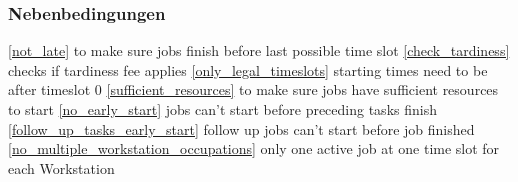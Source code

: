 \documentclass[a4paper,12pt,twoside]{scrreprt}
\begin{document}
\subsubsection*{Nebenbedingungen}
\begin{flushleft}
\autoref{not_late} to make sure jobs finish before last possible time slot\linebreak
\autoref{check_tardiness} checks if tardiness fee applies\linebreak
\autoref{only_legal_timeslots} starting times need to be after timeslot 0\linebreak
\autoref{sufficient_resources} to make sure jobs have sufficient resources to start\linebreak
\autoref{no_early_start} jobs can't start before preceding tasks finish\linebreak
\autoref{follow_up_tasks_early_start} follow up jobs can't start before job finished\linebreak
\autoref{no_multiple_workstation_occupations} only one active job at one time slot for each Workstation\linebreak

\end{flushleft}
\end{document}

